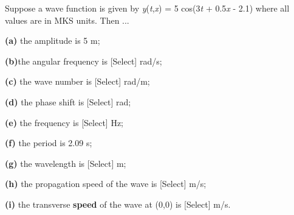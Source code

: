 \documentclass[11pt]{article}
\begin{document}
\begin{enumerate}[leftmargin=*,label=\textbf{Question \arabic*.}]
Suppose a wave function is given by \emph{y}(\emph{t},\emph{x}) = 5 cos(3\emph{t} + 0.5\emph{x} - 2.1) where all values are in MKS units. Then ...

\textbf{(a)} the amplitude is 5
 m;

\textbf{(b)}the angular frequency is [Select]
 rad/s;

\textbf{(c)} the wave number is [Select]
 rad/m;

\textbf{(d) }the phase shift is [Select]
 rad;

\textbf{(e) }the frequency is [Select]
 Hz;

\textbf{(f)} the period is 2.09
 s;

\textbf{(}\textbf{g)} the wavelength is [Select]
 m;

\textbf{(h)} the propagation speed of the wave is [Select]
 m/s;

\textbf{(i)} the transverse \textbf{speed} of the wave at (0,0) is [Select]
 m/s.


\end{enumerate}
\end{document}
